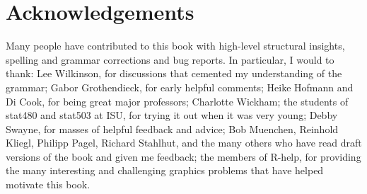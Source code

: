 \section{Acknowledgements}\label{sec:acknolwedgements}

Many people have contributed to this book with high-level structural insights, spelling and grammar corrections and bug reports.  In particular, I would to thank: Lee Wilkinson, for discussions that cemented my understanding of the grammar; Gabor Grothendieck, for early helpful comments; Heike Hofmann and Di Cook, for being great major professors; Charlotte Wickham; the students of stat480 and stat503 at ISU, for trying it out when it was very young; Debby Swayne, for masses of helpful feedback and advice; Bob Muenchen, Reinhold Kliegl, Philipp Pagel, Richard Stahlhut, and the many others who have read draft versions of the book and given me feedback; the members of R-help, for providing the many interesting and challenging graphics problems that have helped motivate this book.


